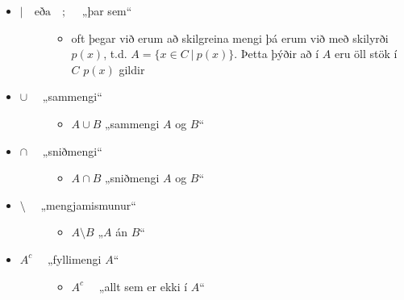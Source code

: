 \documentclass[a4paper,10pt,icelandic]{sphinxmanual}
\begin{document}
\begin{itemize}
\begin{description}
\end{description}

\item {} \begin{description}
\item[{\(| \quad \text{eða} \quad ; \quad\) „þar sem“}] \leavevmode\begin{itemize}
\item {} 
oft þegar við erum að skilgreina mengi þá erum við með skilyrði \(p(x)\), t.d. \(A = \{x \in C \ | \ p(x)\}\). Þetta þýðir að í \(A\) eru öll stök í \(C\)  \(p(x)\) gildir

\end{itemize}

\end{description}

\item {} \begin{description}
\item[{\(\cup \quad\) „sammengi“}] \leavevmode\begin{itemize}
\item {} 
\(A \cup B\) „sammengi \(A\) og \(B\)“

\end{itemize}

\end{description}

\item {} \begin{description}
\item[{\(\cap \quad\) „sniðmengi“}] \leavevmode\begin{itemize}
\item {} 
\(A \cap B\) „sniðmengi \(A\) og \(B\)“

\end{itemize}

\end{description}

\item {} \begin{description}
\item[{\(\setminus \quad\) „mengjamismunur“}] \leavevmode\begin{itemize}
\item {} 
\(A\setminus B\) „\(A\) án \(B\)“

\end{itemize}

\end{description}

\item {} \begin{description}
\item[{\(A^c \quad\) „fyllimengi \(A\)“}] \leavevmode\begin{itemize}
\item {} 
\(A^c \quad\) „allt sem er ekki í \(A\)“


\end{itemize}
\end{description}
\end{itemize}
\end{document}
